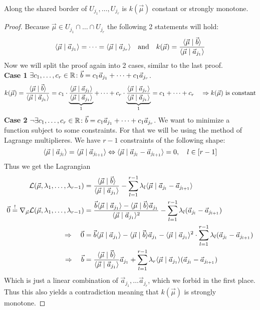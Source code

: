 \begin{lemma}
    Along the shared border of $U_{j_1}, \dots, U_{j_r}$ is $k(\vec\mu)$ constant or strongly monotone.
\end{lemma}
\begin{proof}
    Because $\vec \mu \in U_{j_1}\cap \dots\cap U_{j_r}$ the following 2 statements will hold:
    $$\langle \vec{\mu} \mid \vec a_{j_1} \rangle = \dots = \langle \vec{\mu} \mid \vec a_{j_r} \rangle \quad\textrm{and}\quad k(\vec\mu) = \frac{\langle \vec \mu \mid \vec b \rangle}{\langle \vec \mu \mid \vec a_{j_1} \rangle}$$
    Now we will split the proof again into 2 cases, similar to the last proof.\\
    \textbf{Case 1} $\exists c_1, \dots, c_r \in \mathbb{R}\colon \vec b = c_1\vec a_{j_1} + \dots + c_1\vec a_{j_r}$.
    $$k(\vec\mu) = \frac{\langle \vec \mu \mid \vec b \rangle}{\langle \vec \mu \mid \vec a_{j_1} \rangle} = c_1 \cdot \underbrace{\frac{\langle \vec \mu \mid \vec a_{j_1} \rangle}{\langle \vec \mu \mid \vec a_{j_1} \rangle}}_1 + \dots + c_r \cdot \underbrace{\frac{\langle \vec \mu \mid \vec a_{j_r} \rangle}{\langle \vec \mu \mid \vec a_{j_1} \rangle}}_1 = c_1 + \dots + c_r \quad \Rightarrow k(\vec\mu)\textrm{ is constant}$$
    \textbf{Case 2} $\lnot\exists c_1, \dots, c_r \in \mathbb{R}\colon \vec b = c_1\vec a_{j_1} + \dots + c_1\vec a_{j_r}$. We want to minimize a function subject to some constraints. For that we will be using the method of Lagrange multiplieres. We have $r-1$ constraints of the following shape:
    $$\langle \vec\mu \mid \vec a_{j_l} \rangle = \langle \vec\mu \mid \vec a_{j_{l+1}} \rangle \Leftrightarrow \langle \vec\mu \mid \vec a_{j_l} - \vec a_{j_{l+1}} \rangle = 0, \quad l \in [r-1]$$
    Thus we get the Lagrangian
    \begin{align*}
        \mathcal{L}(\vec\mu, \lambda_1, \dots, \lambda_{r-1}) &= \frac{\langle \vec \mu \mid \vec b \rangle}{\langle \vec \mu \mid \vec a_{j_1} \rangle} - \sum_{l=1}^{r-1}\lambda_l \langle \vec\mu \mid \vec a_{j_l} - \vec a_{j_{l+1}} \rangle\\
        \vec0 \stackrel{!}{=}\nabla_{\vec \mu} \mathcal{L}(\vec\mu, \lambda_1, \dots, \lambda_{r-1}) &= \frac{\vec b\langle \vec\mu \mid \vec a_{j_{1}} \rangle - \langle \vec\mu \mid \vec b \rangle\vec a_{j_{1}}}{\langle \vec\mu \mid \vec a_{j_{1}} \rangle^2} - \sum_{l=1}^{r-1}\lambda_l(\vec a_{j_l} - \vec a_{j_{l+1}}) \\
        \Rightarrow\quad \vec0 &= \vec b\langle \vec\mu \mid \vec a_{j_{1}} \rangle - \langle \vec\mu \mid \vec b \rangle\vec a_{j_{1}} - \langle \vec\mu \mid \vec a_{j_{1}} \rangle^2\cdot\sum_{l=1}^{r-1}\lambda_l(\vec a_{j_l} - \vec a_{j_{l+1}})\\
        \Rightarrow\quad \vec b &= \frac{\langle \vec \mu \mid \vec b \rangle}{\langle \vec \mu \mid \vec a_{j_{1}} \rangle}\vec a_{j_{1}} + \sum_{l=1}^{r-1} \lambda_r \langle \vec\mu \mid \vec a_{j_{1}} \rangle(\vec a_{j_l} - \vec a_{j_{l+1}})
    \end{align*}
    Which is just a linear combination of $\vec a_{j_1}, \dots \vec a_{j_r}$, which we forbid in the first place. Thus this also yields a contradiction meaning that $k(\vec\mu)$ is strongly monotone.
\end{proof}

